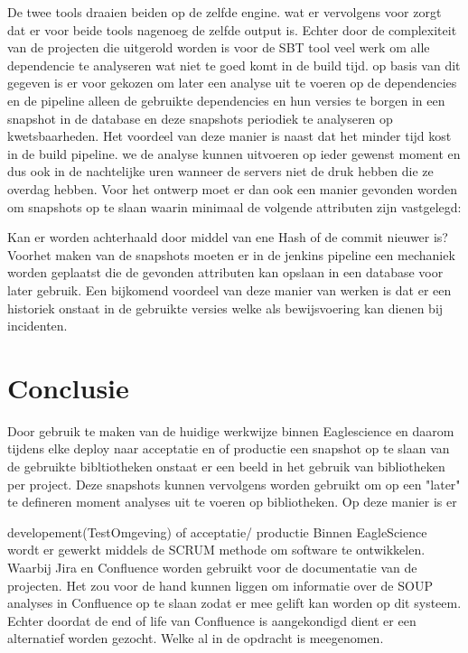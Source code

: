 De twee tools draaien beiden op de zelfde engine. wat er vervolgens voor zorgt dat er voor beide tools nagenoeg de zelfde output is. Echter door de complexiteit van de projecten die uitgerold worden is voor de SBT tool veel werk om alle dependencie te analyseren wat niet te goed komt in de build tijd. op basis van dit gegeven is er voor gekozen om later een analyse uit te voeren op de dependencies en de pipeline alleen de gebruikte dependencies en hun versies te borgen in een snapshot in de database en deze snapshots periodiek te analyseren op kwetsbaarheden. Het voordeel van deze manier is naast dat het minder tijd kost in de build pipeline. we de analyse kunnen uitvoeren op ieder gewenst moment en dus ook in de nachtelijke uren wanneer de servers niet de druk hebben die ze overdag hebben. Voor het ontwerp moet er dan ook een manier gevonden worden om snapshots op te slaan waarin minimaal de volgende attributen zijn vastgelegd:

Kan er worden achterhaald door middel van ene Hash of de commit nieuwer is?
Voorhet maken van de snapshots moeten er in de jenkins pipeline een mechaniek worden geplaatst die de gevonden attributen kan opslaan in een database voor later gebruik.
Een bijkomend voordeel van deze manier van werken is dat er een historiek onstaat in de gebruikte versies welke als bewijsvoering kan dienen bij incidenten.





\section{Conclusie}\label{sec:ESconclusie}
Door gebruik te maken van de huidige werkwijze binnen Eaglescience en daarom tijdens elke deploy naar acceptatie en of productie een snapshot op te slaan van de gebruikte bibltiotheken onstaat er een beeld in het gebruik van bibliotheken per project. Deze snapshots kunnen vervolgens worden gebruikt om op een "later" te defineren moment analyses uit te voeren op bibliotheken. Op deze manier is er

developement(TestOmgeving) of acceptatie/ productie
Binnen EagleScience wordt er gewerkt middels de SCRUM methode om software te ontwikkelen. Waarbij Jira en Confluence worden gebruikt voor de documentatie van de projecten. Het zou voor de hand kunnen liggen om informatie over de SOUP analyses in Confluence op te slaan zodat er mee gelift kan worden op dit systeem. Echter doordat de end of life van Confluence is aangekondigd dient er een alternatief worden gezocht. Welke al in de opdracht is meegenomen.

